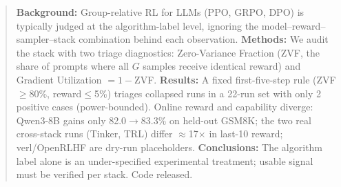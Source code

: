 \begin{abstract}
\noindent\textbf{Background:} Group-relative RL for LLMs (PPO, GRPO, DPO) is
typically judged at the algorithm-label level, ignoring the
model--reward--sampler--stack combination behind each observation.
\textbf{Methods:} We audit the stack with two triage diagnostics:
Zero-Variance Fraction (ZVF, the share of prompts where all $G$ samples
receive identical reward) and Gradient Utilization $=1-$ZVF.
\textbf{Results:} A fixed first-five-step rule (ZVF$\geq$80\%, reward$\leq$5\%)
triages collapsed runs in a 22-run set with only 2 positive cases
(power-bounded). Online reward and capability diverge: Qwen3-8B gains only
82.0$\to$83.3\% on held-out GSM8K; the two real cross-stack runs (Tinker,
TRL) differ $\approx$17$\times$ in last-10 reward; verl/OpenRLHF are
dry-run placeholders.
\textbf{Conclusions:} The algorithm label alone is an under-specified
experimental treatment; usable signal must be verified per stack.
Code released.
\end{abstract}
